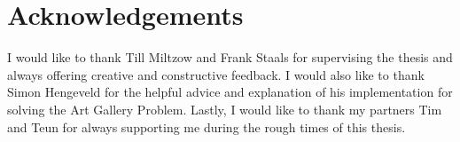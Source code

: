 \section*{Acknowledgements}
I would like to thank Till Miltzow and Frank Staals for supervising the thesis and always offering creative and constructive feedback. I would also like to thank Simon Hengeveld for the helpful advice and explanation of his implementation for solving the Art Gallery Problem.
Lastly, I would like to thank my partners Tim and Teun for always supporting me during the rough times of this thesis.